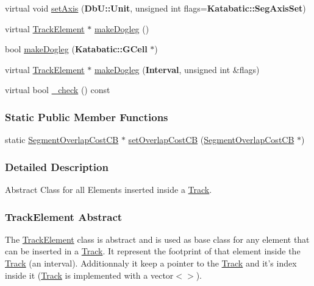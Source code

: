 \begin{DoxyCompactItemize}
\item 
virtual void \hyperlink{classKite_1_1TrackElement_a45e685b1e3ee630d24bf43746553af4c}{set\-Axis} ({\bf Db\-U\-::\-Unit}, unsigned int flags={\bf Katabatic\-::\-Seg\-Axis\-Set})
\item 
virtual \hyperlink{classKite_1_1TrackElement}{Track\-Element} $\ast$ \hyperlink{classKite_1_1TrackElement_a7a9637875364e84e6862de0102341715}{make\-Dogleg} ()
\item 
bool \hyperlink{classKite_1_1TrackElement_a3e1b4982a2427f74e55592520ab6272d}{make\-Dogleg} ({\bf Katabatic\-::\-G\-Cell} $\ast$)
\item 
virtual \hyperlink{classKite_1_1TrackElement}{Track\-Element} $\ast$ \hyperlink{classKite_1_1TrackElement_a524f1569b2f2c1a84df2fe47e84e28ed}{make\-Dogleg} ({\bf Interval}, unsigned int \&flags)
\item 
virtual bool \hyperlink{classKite_1_1TrackElement_aa1ef325b98fab61d2c7c5bdc1fcd92fc}{\-\_\-check} () const 
\end{DoxyCompactItemize}
\subsubsection*{Static Public Member Functions}
\begin{DoxyCompactItemize}
\item 
static \hyperlink{namespaceKite_aa5bc3df660243357cdf8639f57d4a41b}{Segment\-Overlap\-Cost\-C\-B} $\ast$ \hyperlink{classKite_1_1TrackElement_a4648fa47d0870cf743436ff6a6239fd9}{set\-Overlap\-Cost\-C\-B} (\hyperlink{namespaceKite_aa5bc3df660243357cdf8639f57d4a41b}{Segment\-Overlap\-Cost\-C\-B} $\ast$)
\end{DoxyCompactItemize}


\subsubsection{Detailed Description}
Abstract Class for all Elements inserted inside a \hyperlink{classKite_1_1Track}{Track}. 

\hypertarget{classKite_1_1TrackElement_secTrackElementAbstract}{}\subsubsection{Track\-Element Abstract}\label{classKite_1_1TrackElement_secTrackElementAbstract}
The \hyperlink{classKite_1_1TrackElement}{Track\-Element} class is abstract and is used as base class for any element that can be inserted in a \hyperlink{classKite_1_1Track}{Track}. It represent the footprint of that element inside the \hyperlink{classKite_1_1Track}{Track} (an interval). Additionnaly it keep a pointer to the \hyperlink{classKite_1_1Track}{Track} and it's index inside it (\hyperlink{classKite_1_1Track}{Track} is implemented with a {\ttfamily vector$<$$>$}).

